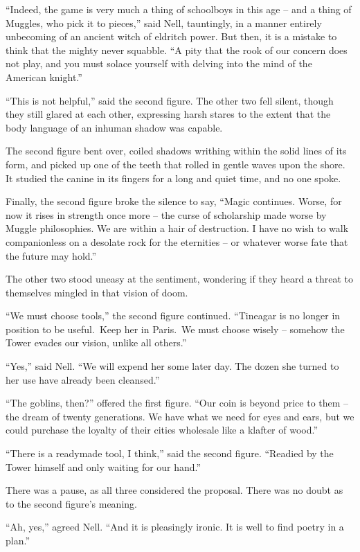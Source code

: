 ``Indeed, the game is very much a thing of schoolboys in this age -- and
a thing of Muggles, who pick it to pieces,'' said Nell, tauntingly, in a
manner entirely unbecoming of an ancient witch of eldritch power. But
then, it is a mistake to think that the mighty never squabble. ``A pity
that the rook of our concern does not play, and you must solace yourself
with delving into the mind of the American knight.''

``This is not helpful,'' said the second figure. The other two fell
silent, though they still glared at each other, expressing harsh stares
to the extent that the body language of an inhuman shadow was capable.

The second figure bent over, coiled shadows writhing within the solid
lines of its form, and picked up one of the teeth that rolled in gentle
waves upon the shore. It studied the canine in its fingers for a long
and quiet time, and no one spoke.

Finally, the second figure broke the silence to say, ``Magic continues.
Worse, for now it rises in strength once more -- the curse of
scholarship made worse by Muggle philosophies. We are within a hair of
destruction. I have no wish to walk companionless on a desolate rock for
the eternities -- or whatever worse fate that the future may hold.''

The other two stood uneasy at the sentiment, wondering if they heard a
threat to themselves mingled in that vision of doom.

``We must choose tools,'' the second figure continued. ``Tineagar is no
longer in position to be useful.~Keep her in Paris.~We must choose
wisely -- somehow the Tower evades our vision, unlike all others.''

``Yes,'' said Nell. ``We will expend her some later day. The dozen she
turned to her use have already been cleansed.''

``The goblins, then?'' offered the first figure. ``Our coin is beyond
price to them -- the dream of twenty generations. We have what we need
for eyes and ears, but we could purchase the loyalty of their cities
wholesale like a klafter of wood.''

``There is a readymade tool, I think,'' said the second figure.
``Readied by the Tower himself and only waiting for our hand.''

There was a pause, as all three considered the proposal. There was no
doubt as to the second figure's meaning.

``Ah, yes,'' agreed Nell. ``And it is pleasingly ironic. It is well to
find poetry in a plan.''


